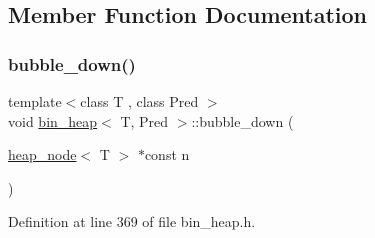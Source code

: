 \subsection{Member Function Documentation}
\mbox{\label{classbin__heap_a6c16b71925f4df063778aadc527a6fc6}} 
\subsubsection{\texorpdfstring{bubble\+\_\+down()}{bubble\_down()}}
{\footnotesize\ttfamily template$<$class T , class Pred $>$ \\
void \mbox{\hyperlink{classbin__heap}{bin\+\_\+heap}}$<$ T, Pred $>$\+::bubble\+\_\+down (\begin{DoxyParamCaption}\item[{\mbox{\hyperlink{classheap__node}{heap\+\_\+node}}$<$ T $>$ $\ast$const}]{n }\end{DoxyParamCaption})\hspace{0.3cm}{\ttfamily [private]}}



Definition at line 369 of file bin\+\_\+heap.\+h.


